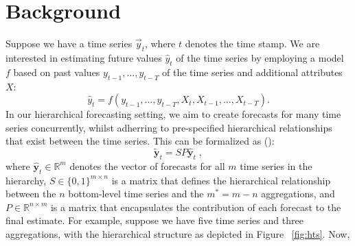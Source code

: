 \documentclass{article}
\begin{document}
\section{Background}
  \label{sec:background}
  Suppose we have a time series \(\vec{y}_t\), where \(t\) denotes the time stamp. We are interested in estimating future values \(\hat{y}_{t}\) of the time series by employing a model \(f\) based on past values \(y_{t-1}, \dots, y_{t-T}\) of the time series and additional attributes \(X\):
  \begin{equation}
    \hat{y}_{t} = f(y_{t-1}, \dots, y_{t-T}, X_{t}, X_{t-1}, \dots, X_{t-T}).
  \end{equation}
  In our hierarchical forecasting setting, we aim to create forecasts for many time series concurrently, whilst adherring to pre-specified hierarchical relationships that exist between the time series. This can be formalized as (\cite{hyndman_forecasting_2021}):
  \begin{equation} \label{eq:hfp}
    \tilde{\textbf{y}}_{t} = SP\hat{\textbf{y}}_{t} \;,
  \end{equation}
  where \(\hat{\textbf{y}}_{t} \in \mathbb{R}^{m} \) denotes the vector of forecasts for all \(m\) time series in the hierarchy, \(S \in \{0, 1\}^{m \times n}\) is a matrix that defines the hierarchical relationship between the \(n\) bottom-level time series and the \(m^* = m - n\) aggregations, and \(P \in \mathbb{R}^{n \times m}\) is a matrix that encapsulates the contribution of each forecast to the final estimate. For example, suppose we have five time series and three aggregations, with the hierarchical structure as depicted in Figure~
  \ref{fig:hts}. Now,
\end{document}
